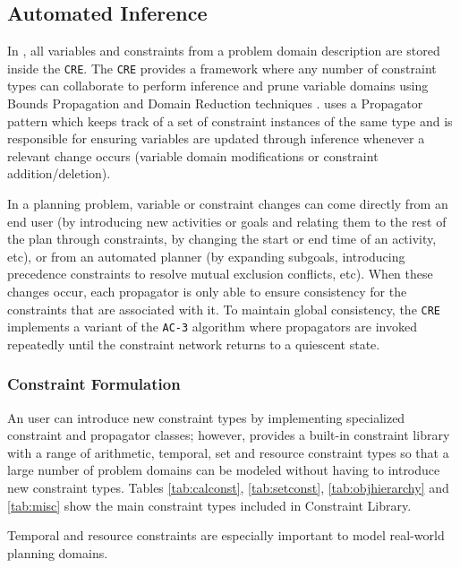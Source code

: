 \subsection{Automated Inference}
\label{sec:europa:inference}

In \eue, all variables and constraints from a problem domain
description are stored inside the \texttt{CRE}.  The \texttt{CRE}
provides a framework where any number of constraint types can
collaborate to perform inference and prune variable domains using
Bounds Propagation and Domain Reduction techniques \cite{marriott98}. 
\eu uses a Propagator pattern which keeps track of a set of
constraint instances of the same type and is responsible for ensuring
variables are updated through inference whenever a relevant change occurs
 (variable domain modifications or constraint addition/deletion).

In a planning problem, variable or constraint changes can come
directly from an end user (by introducing new activities or goals and
relating them to the rest of the plan through constraints, by changing
the start or end time of an activity, etc), or from an automated planner (by
expanding subgoals, introducing precedence constraints to resolve
mutual exclusion conflicts, etc). When these changes occur, each
propagator is only able to ensure consistency for the constraints that
are associated with it.  To maintain global consistency, the
\texttt{CRE} implements a variant of the \texttt{AC-3} algorithm
\cite{mackworth77} where propagators are invoked repeatedly until
the constraint network returns to a quiescent state.

\subsubsection{Constraint Formulation}
\label{sec:europa:constraints}

An \eu user can introduce new constraint types by implementing
specialized constraint and propagator classes; however, \eu provides a
built-in constraint library with a range of arithmetic, temporal, set
and resource constraint types so that a large number of problem
domains can be modeled without having to introduce new constraint
types. Tables \ref{tab:calconst}, \ref{tab:setconst},
\ref{tab:objhierarchy} and \ref{tab:misc} show the main constraint
types included in \eus Constraint Library.



Temporal and resource constraints are especially important to model
real-world planning domains. 

